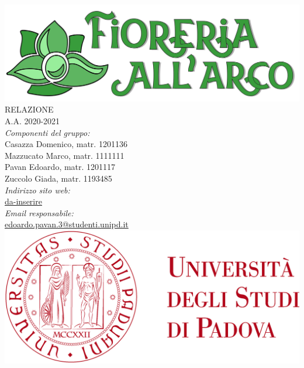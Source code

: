 \thispagestyle{empty}
\begin{titlepage}
	\begin{center}
		
		\includegraphics[scale = 0.05]{../latex/images/logotitle.png}\\[1.5cm]
\Huge \textsc{RELAZIONE \doctitle{}}\\ [0.75cm]                          
\Large \textsf{A.A. 2020-2021} \\ [1cm]
		

\Large \textsl{Componenti del gruppo:} \\[0.25cm] \textsf{Casazza Domenico, matr. 1201136} \\ [0.1cm]
\Large \textsf{Mazzucato Marco, matr. 1111111} \\ [0.1cm]
\Large \textsf{Pavan Edoardo, matr. 1201117} \\ [0.1cm]
\Large \textsf{Zuccolo Giada, matr. 1193485} \\ [1.75cm]
                
\Large \textsl{Indirizzo sito web:} \\ \textsf{\href{http://www.google.it}{da-inserire}}\\[0.25cm]
\Large \textsl{Email responsabile:}\\ 
\textsf{\href{edoardo.pavan.3@studenti.unipd.it}{edoardo.pavan.3@studenti.unipd.it}}\\[1cm]

		\includegraphics[scale = 0.055]{../latex/images/logoUniPD.png}


	\end{center}
\end{titlepage}
